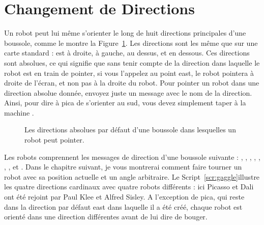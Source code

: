 \documentclass[a4paper,10pt,twoside]{book}
\begin{document}
\section{Changement de Directions}

Un robot peut lui m\^eme s'orienter le long de huit directions principales d'une boussole, comme le montre la 
Figure~\ref{fig:roseDesVents}. Les directions sont les m\^eme que sur une carte standard :  est \`a droite,  \`a gauche,  au dessus, et  en dessous. Ces directions sont absolues, ce qui signifie que sans tenir compte de la direction dans laquelle le robot est en train de pointer, si vous l'appelez au point east, le robot pointera \`a droite de l'\'ecran, et non pas \`a la droite du robot. Pour pointer un robot dans une direction absolue donn\'ee, envoyez juste un message avec le nom de la direction. Ainsi, pour dire \`a pica de s'orienter au sud, vous devez simplement taper \`a la machine 
. 

\begin{figure}
\caption{Les directions absolues par d\'efaut d'une boussole dans lesquelles un robot peut pointer. 
\label{fig:roseDesVents}}
\end{figure}

Les robots comprennent les messages de direction d'une boussole suivante : , , , 
, , , , et . Dans le chapitre suivant, je vous montrerai comment faire tourner un robot avec sa position actuelle et un angle arbitraire. 
Le Script~\ref{scr:gaggle}illustre les quatre directions cardinaux avec quatre robots diff\'erents : 
ici Picasso et Dali ont \'et\'e rejoint par Paul Klee et Alfred Sisley. A l'exception de pica, qui reste 
dans la direction par d\'efaut east dans laquelle il a \'et\'e cr\'e\'e, chaque robot est orient\'e dans une direction 
diff\'erentes avant de lui dire de bouger.
\end{document}
